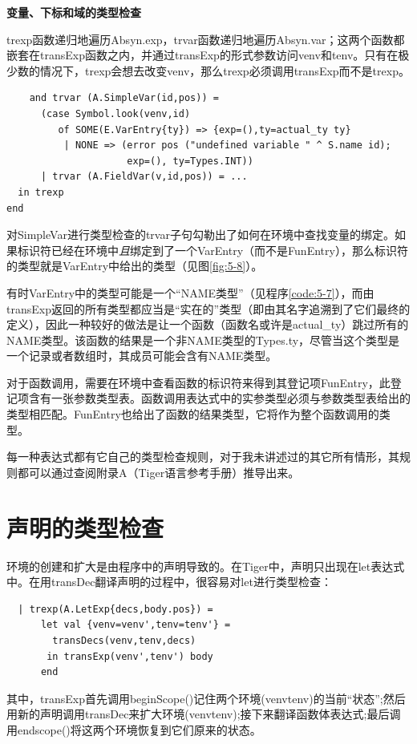 \documentclass[cn,11pt,chinese]{elegantbook}
\begin{document}
\textbf{变量、下标和域的类型检查}

trexp函数递归地遍历Absyn.exp，trvar函数递归地遍历Absyn.var；这两个函数都嵌套在transExp函数之内，并通过transExp的形式参数访问venv和tenv。只有在极少数的情况下，trexp会想去改变venv，那么trexp必须调用transExp而不是trexp。

\begin{lstlisting}
    and trvar (A.SimpleVar(id,pos)) =
      (case Symbol.look(venv,id)
         of SOME(E.VarEntry{ty}) => {exp=(),ty=actual_ty ty}
          | NONE => (error pos ("undefined variable " ^ S.name id);
                     exp=(), ty=Types.INT))
      | trvar (A.FieldVar(v,id,pos)) = ...
  in trexp
end
\end{lstlisting}

对SimpleVar进行类型检查的trvar子句勾勒出了如何在环境中查找变量的绑定。如果标识符已经在环境中\textit{且}绑定到了一个VarEntry（而不是FunEntry），那么标识符的类型就是VarEntry中给出的类型（见图\ref{fig:5-8}）。

有时VarEntry中的类型可能是一个“NAME类型”（见程序\ref{code:5-7}），而由transExp返回的所有类型都应当是“实在的”类型（即由其名字追溯到了它们最终的定义），因此一种较好的做法是让一个函数（函数名或许是actual\_ty）跳过所有的NAME类型。该函数的结果是一个非NAME类型的Types.ty，尽管当这个类型是一个记录或者数组时，其成员可能会含有NAME类型。

对于函数调用，需要在环境中查看函数的标识符来得到其登记项FunEntry，此登记项含有一张参数类型表。函数调用表达式中的实参类型必须与参数类型表给出的类型相匹配。FunEntry也给出了函数的结果类型，它将作为整个函数调用的类型。

每一种表达式都有它自己的类型检查规则，对于我未讲述过的其它所有情形，其规则都可以通过查阅附录A（Tiger语言参考手册）推导出来。

\section{声明的类型检查}

环境的创建和扩大是由程序中的声明导致的。在Tiger中，声明只出现在let表达式中。在用transDec翻译声明的过程中，很容易对let进行类型检查：

\begin{lstlisting}
  | trexp(A.LetExp{decs,body.pos}) =
      let val {venv=venv',tenv=tenv'} =
        transDecs(venv,tenv,decs)
       in transExp(venv',tenv') body
      end
\end{lstlisting}

其中，transExp首先调用beginScope()记住两个环境(venvtenv)的当前“状态”;然后用新的声明调用transDec来扩大环境(venvtenv);接下来翻译函数体表达式;最后调用endscope()将这两个环境恢复到它们原来的状态。
\end{document}
